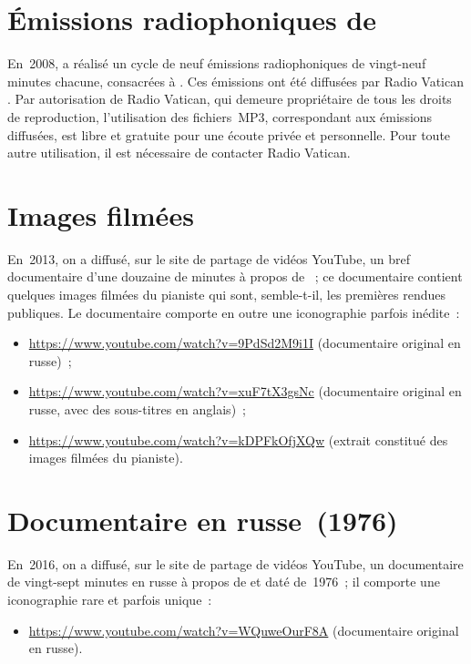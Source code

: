 \section[%
Émissions radiophoniques de Valerij Voskobojnikov]{%
Émissions radiophoniques de \VVoskobojnikov{}}

En~2008, \VVoskobojnikov{} a réalisé un cycle de neuf émissions
radiophoniques de vingt-neuf minutes chacune, consacrées à \VSofronitsky{}.
Ces émissions ont été diffusées par Radio Vatican
\citep[voir][]{Voskobojnikov08}.
Par autorisation de Radio Vatican, qui demeure propriétaire de tous les
droits de reproduction, l'utilisation des fichiers~MP3, correspondant aux
émissions diffusées, est libre et gratuite pour une écoute privée et
personnelle.
Pour toute autre utilisation, il est nécessaire de contacter Radio Vatican.

\section[%
Images filmées]{%
Images filmées}

En~2013, on a diffusé, sur le site de partage de vidéos YouTube, un bref
documentaire d'une douzaine de minutes à propos de \VSofronitsky{}~; ce
documentaire contient quelques images filmées du pianiste qui sont,
\hbox{semble-t-il}, les premières rendues publiques.
Le documentaire comporte en outre une iconographie parfois inédite~:
\begin{itemize}
 \item \url{https://www.youtube.com/watch?v=9PdSd2M9i1I}
 (documentaire original en russe)~;
 \item \url{https://www.youtube.com/watch?v=xuF7tX3gsNc}
 (documentaire original en russe, avec des sous-titres en anglais)~;
 \item \url{https://www.youtube.com/watch?v=kDPFkOfjXQw}
 (extrait constitué des images filmées du pianiste).
\end{itemize}

\section[%
Documentaire en russe~(1976)]{%
Documentaire en russe~(1976)}

En~2016, on a diffusé, sur le site de partage de vidéos YouTube, un
documentaire de vingt-sept minutes en russe à propos de \VSofronitsky{} et
daté de~1976~; il comporte une iconographie rare et parfois unique~:
\begin{itemize}
 \item \url{https://www.youtube.com/watch?v=WQuweOurF8A}
 (documentaire original en russe).
\end{itemize}
